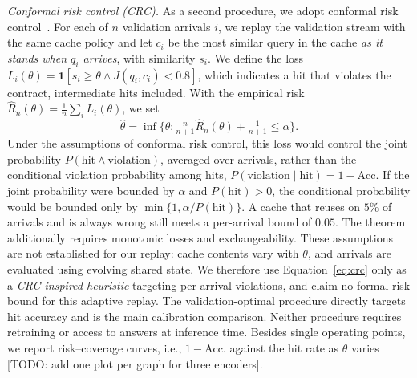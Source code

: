 \documentclass[runningheads]{llncs}
\newcommand{\hp}[1]{{\color{red!75!black}#1}}
\begin{document}
\emph{Conformal risk control (CRC).} As a second procedure, we adopt
conformal risk control~\cite{angelopoulos2024crc,vovk2005alrw}. For each of
$n$ validation arrivals $i$, we replay the validation stream with the same
cache policy and let $c_i$ be the most similar query in the cache \emph{as it
stands when $q_i$ arrives}, with similarity $s_i$. We define the loss
$L_i(\theta) = \mathbf{1}[s_i \geq \theta \wedge J(q_i,c_i) < 0.8]$, which
indicates a hit that violates the contract, intermediate hits included. With
the empirical risk $\hat{R}_n(\theta) = \frac{1}{n}\sum_i L_i(\theta)$, we set
\begin{equation}
\hat{\theta} = \inf\Big\{\theta : \tfrac{n}{n+1}\hat{R}_n(\theta) + \tfrac{1}{n+1} \leq \alpha\Big\}.
\label{eq:crc}
\end{equation}
Under the assumptions of conformal risk control, this loss would control
the joint probability $P(\text{hit} \wedge \text{violation})$, averaged over
arrivals, rather than the conditional violation probability among hits,
$P(\text{violation} \mid \text{hit}) = 1 - \mathrm{Acc.}$ If the joint
probability were bounded by $\alpha$ and $P(\text{hit}) > 0$, the conditional
probability would be bounded only by
$\min\{1, \alpha/P(\text{hit})\}$. A cache that reuses on $5\%$ of arrivals
and is always wrong still meets a per-arrival bound of $0.05$.
The theorem additionally requires monotonic losses and exchangeability.
These assumptions are not established for our replay: cache contents vary
with $\theta$, and arrivals are evaluated using evolving shared state. We
therefore use Equation~\ref{eq:crc} only as a \emph{CRC-inspired heuristic}
targeting per-arrival violations, and claim no formal risk bound for this
adaptive replay. The validation-optimal procedure directly targets hit
accuracy and is the main calibration comparison.
Neither procedure requires retraining or access to
answers at inference time. Besides single operating points, we report
risk--coverage curves, i.e., $1 - \mathrm{Acc.}$ against the hit rate as
$\theta$ varies \hp{[TODO: add one plot per graph for three encoders]}.
\end{document}
